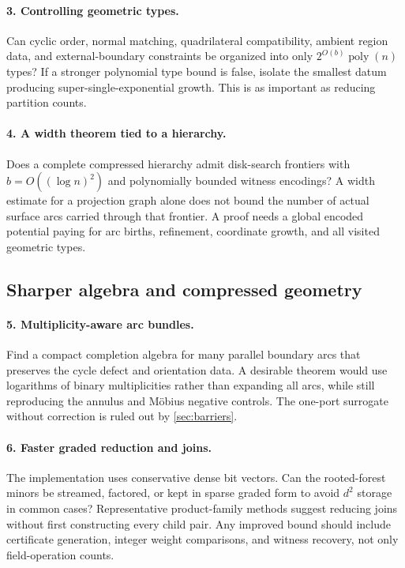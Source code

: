 \documentclass[11pt,a4paper]{article}
\theoremstyle{definition}
\theoremstyle{remark}
\newcommand{\poly}{\operatorname{poly}}
\begin{document}
\paragraph{3. Controlling geometric types.}
Can cyclic order, normal matching, quadrilateral compatibility, ambient region data,
and external-boundary constraints be organized into only $2^{O(b)}\poly(n)$ types?
If a stronger polynomial type bound is false, isolate the smallest datum producing
super-single-exponential growth. This is as important as reducing partition counts.

\paragraph{4. A width theorem tied to a hierarchy.}
Does a complete compressed hierarchy admit disk-search frontiers with
$b=O((\log n)^2)$ and polynomially bounded witness encodings? A width estimate for
a projection graph alone does not bound the number of actual surface arcs carried
through that frontier. A proof needs a global encoded potential paying for arc births,
refinement, coordinate growth, and all visited geometric types.

\subsection{Sharper algebra and compressed geometry}
\paragraph{5. Multiplicity-aware arc bundles.}
Find a compact completion algebra for many parallel boundary arcs that preserves the
cycle defect and orientation data. A desirable theorem would use logarithms of binary
multiplicities rather than expanding all arcs, while still reproducing the annulus and
M\"obius negative controls. The one-port surrogate without correction is ruled out
by \cref{sec:barriers}.

\paragraph{6. Faster graded reduction and joins.}
The implementation uses conservative dense bit vectors. Can the rooted-forest minors
be streamed, factored, or kept in sparse graded form to avoid $d^2$ storage in common
cases? Representative product-family methods \cite{products} suggest reducing joins
without first constructing every child pair. Any improved bound should include
certificate generation, integer weight comparisons, and witness recovery, not only
field-operation counts.
\end{document}
